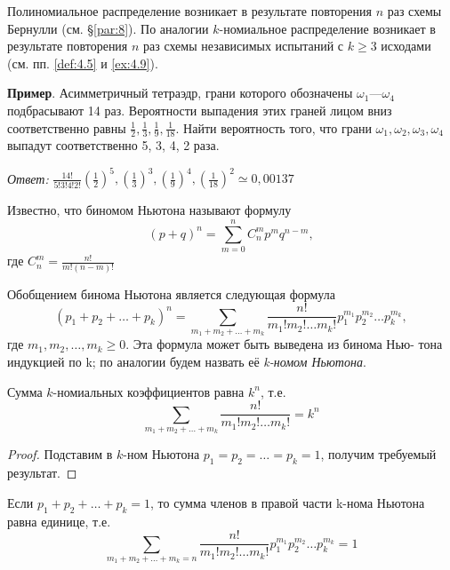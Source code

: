 
Полиномиальное распределение возникает в результате повторения $n$ раз
схемы Бернулли (см. \S\ref{par:8}). По аналогии $k$-номиальное распределение возникает в результате повторения $n$ раз схемы независимых испытаний с $k \geqslant 3$
исходами (см. пп. \ref{def:4.5} и \ref{ex:4.9}).

\textbf{Пример}. Асимметричный тетраэдр, грани которого обозначены $\omega_1$---$\omega_4$ подбрасывают 14 раз. Вероятности выпадения этих граней лицом вниз
соответственно равны $\frac{1}{2},\frac{1}{3},\frac{1}{9},\frac{1}{18}$. Найти вероятность того, что грани $\omega_1, \omega_2, \omega_3, \omega_4$ выпадут соответственно 5, 3, 4, 2 раза.

\textit{Ответ: }$\frac{14!}{5!3!4!2!}(\frac{1}{2})^5,(\frac{1}{3})^3,(\frac{1}{9})^4,(\frac{1}{18})^2\simeq0,00137$

\begin{zam}
\label{zam:9.1}
	Известно, что биномом Ньютона называют формулу
	\begin{equation*}
		(p+q)^n	=\sum\limits^n_{m=0}C_n^mp^mq^{n-m},
	\end{equation*}
	где $C_n^m=\frac{n!}{m!(n-m)!}$


Обобщением бинома Ньютона является следующая формула
\begin{equation*}
	(p_1+p_2+\ldots+ p_k)^n=\sum\limits_{m_1+m_2+\ldots+m_k}\frac{n!}{m_1!m_2!\ldots m_k!}p_1^{m_1}p_2^{m_2}\ldots p_k^{m_k},
\end{equation*}
где $m_1, m_2,\ldots, m_k \geqslant 0$. Эта формула может быть выведена из бинома Нью-
тона индукцией по k; по аналогии будем назвать её \textit{k-номом Ньютона}.

\end{zam}

\begin{lemma}
\label{lemma:9.2}

	Сумма $k$-номиальных коэффициентов равна $k^n$, т.е.
	\begin{equation*}
		\sum\limits_{m_1+m_2+\ldots+m_k}\frac{n!}{m_1!m_2!\ldots m_k!}=k^n
	\end{equation*}

\end{lemma}

\begin{proof}
Подставим в $k$-ном Ньютона $p_1 = p_2 = \ldots = p_k = 1$,
получим требуемый результат.
\end{proof}

\begin{lemma}
\label{lemma:9.3}

	Если $p_1+p_2+\ldots+p_k = 1$, то сумма членов в правой части
k-нома Ньютона равна единице, т.е.
\begin{equation*}
	\sum\limits_{m_1+m_2+\ldots+m_k=n}\frac{n!}{m_1!m_2!\ldots m_k!}p_1^{m_1}p_2^{m_2}\ldots p_k^{m_k}=1
\end{equation*}
\end{lemma}


